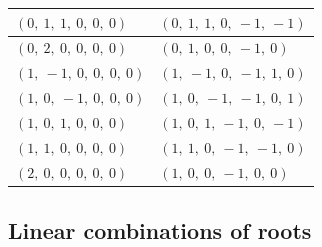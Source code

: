 \documentclass[11pt]{article}
\theoremstyle{definition}
\newif\ifsummablepairs
\begin{document}
\begin{tabular}{|l|l|}
    \hline
    $\left( 0, \  1, \  1, \  0, \  0, \  0\right)$ & $\left( 0, \  1, \  1, \  0, \  -1, \  -1\right)$ \\
    \hline
    $\left( 0, \  2, \  0, \  0, \  0, \  0\right)$ & $\left( 0, \  1, \  0, \  0, \  -1, \  0\right)$ \\
    \hline
    $\left( 1, \  -1, \  0, \  0, \  0, \  0\right)$ & $\left( 1, \  -1, \  0, \  -1, \  1, \  0\right)$ \\
    \hline
    $\left( 1, \  0, \  -1, \  0, \  0, \  0\right)$ & $\left( 1, \  0, \  -1, \  -1, \  0, \  1\right)$ \\
    \hline
    $\left( 1, \  0, \  1, \  0, \  0, \  0\right)$ & $\left( 1, \  0, \  1, \  -1, \  0, \  -1\right)$ \\
    \hline
    $\left( 1, \  1, \  0, \  0, \  0, \  0\right)$ & $\left( 1, \  1, \  0, \  -1, \  -1, \  0\right)$ \\
    \hline
    $\left( 2, \  0, \  0, \  0, \  0, \  0\right)$ & $\left( 1, \  0, \  0, \  -1, \  0, \  0\right)$ \\
    \hline
\end{tabular}


\ifsummablepairs
\subsection{Linear combinations of roots}
\end{document}
